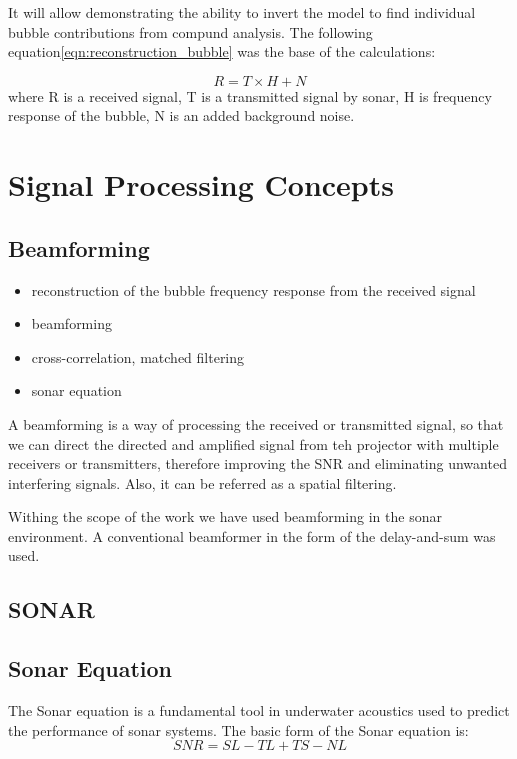 It will allow demonstrating the ability to invert the model to find individual bubble contributions from compund analysis.
The following equation\ref{eqn:reconstruction_bubble} was the base of the calculations:

\begin{equation}\label{eqn:reconstruction_bubble}
    R = T \times H + N
\end{equation}
where R is a received signal, T is a transmitted signal by sonar, H is frequency response of the bubble, N is an added background noise.

\section*{Signal Processing Concepts}
\subsection{Beamforming}
\begin{itemize}
    \item reconstruction of the bubble frequency response from the received signal
    \item beamforming
    \item cross-correlation, matched filtering
    \item sonar equation
\end{itemize}

A beamforming is a way of processing the received or transmitted signal, so that we can direct the directed and amplified signal from teh projector with multiple receivers or transmitters, therefore improving the SNR and eliminating unwanted interfering signals. Also, it can be referred as a spatial filtering.

Withing the scope of the work we have used beamforming in the sonar environment. A conventional beamformer in the form of the delay-and-sum was used. 

\subsection{SONAR}

\subsection{Sonar Equation }
The Sonar equation is a fundamental tool in underwater acoustics used to predict the performance of sonar systems. 
The basic form of the Sonar equation is:
\begin{equation}
    SNR=SL-TL+TS-NL
\end{equation}

